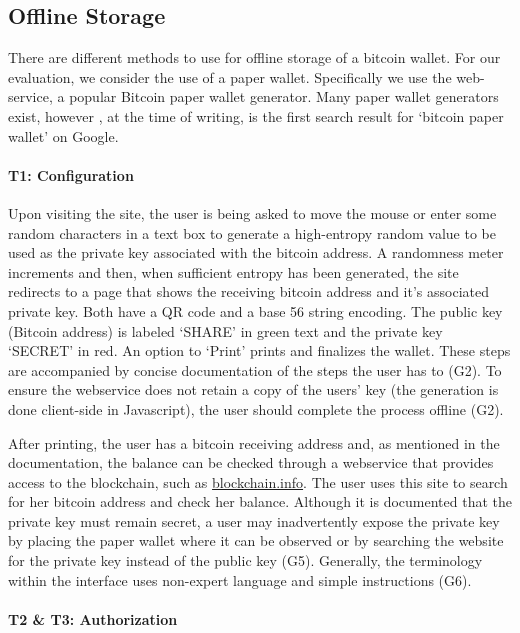 

\subsection{Offline Storage}

There are different methods to use for offline storage of a bitcoin wallet. For our evaluation, we consider the use of a paper wallet. Specifically we use the \paper web-service, a popular Bitcoin paper wallet generator. Many paper wallet generators exist, however \paper, at the time of writing, is the first search result for `bitcoin paper wallet' on Google.


\paragraph{T1: Configuration} Upon visiting the site, the user is being asked to move the mouse or enter some random characters in a text box to generate a high-entropy random value to be used as the private key associated with the bitcoin address. A randomness meter increments and then, when sufficient entropy has been generated, the site redirects to a page that shows the receiving bitcoin address and it's associated private key. Both have a QR code and a base 56 string encoding. The public key (Bitcoin address) is labeled `SHARE' in green text and the private key `SECRET' in red. An option to `Print' prints and finalizes the wallet. These steps are accompanied by concise documentation of the steps the user has to (G2). To ensure the webservice does not retain a copy of the users' key (the generation is done client-side in Javascript), the user should complete the process offline (G2).

After printing, the user has a bitcoin receiving address and, as mentioned in the documentation, the balance can be checked through a webservice that provides access to the blockchain, such as \url{blockchain.info}. The user uses this site to search for her bitcoin address and check her balance. Although it is documented that the private key must remain secret, a user may inadvertently expose the private key by placing the paper wallet where it can be observed or by searching the website for the private key instead of the public key (G5). Generally, the terminology within the \paper interface uses non-expert language and simple instructions (G6).

\paragraph{T2 \& T3: Authorization}


